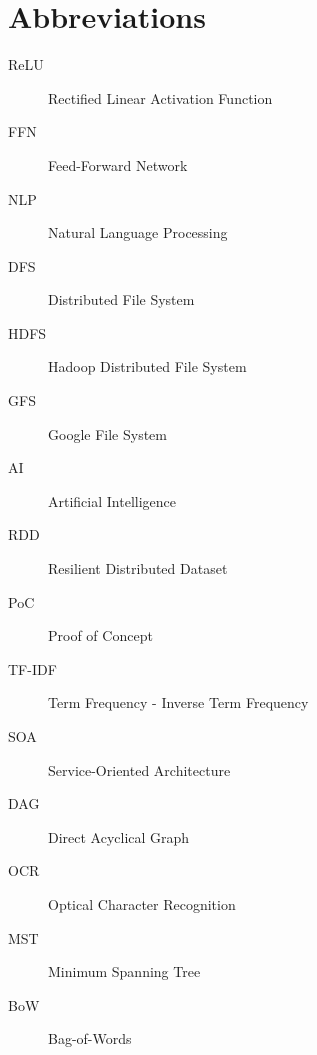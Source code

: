 \documentclass[\main/main.tex]{subfiles}
\begin{document}
\chapter*{Abbreviations}

\begin{description}
    \item[ReLU] Rectified Linear Activation Function
    \item[FFN] Feed-Forward Network
    \item[NLP] Natural Language Processing
    \item[DFS] Distributed File System
    \item[HDFS] Hadoop Distributed File System
    \item[GFS] Google File System
    \item[AI] Artificial Intelligence
    \item[RDD] Resilient Distributed Dataset
    \item[PoC] Proof of Concept
    \item[TF-IDF] Term Frequency - Inverse Term Frequency
    \item[SOA] Service-Oriented Architecture
    \item[DAG] Direct Acyclical Graph
    \item[OCR] Optical Character Recognition
    \item[MST] Minimum Spanning Tree
    \item[BoW] Bag-of-Words
\end{description}
\end{document}

